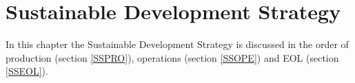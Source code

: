 \chapter{Sustainable Development Strategy}
\label{SS}

In this chapter the Sustainable Development Strategy is discussed in the order of production (section \ref{SSPRO}), operations (section \ref{SSOPE}) and \ac{EOL} (section \ref{SSEOL}).